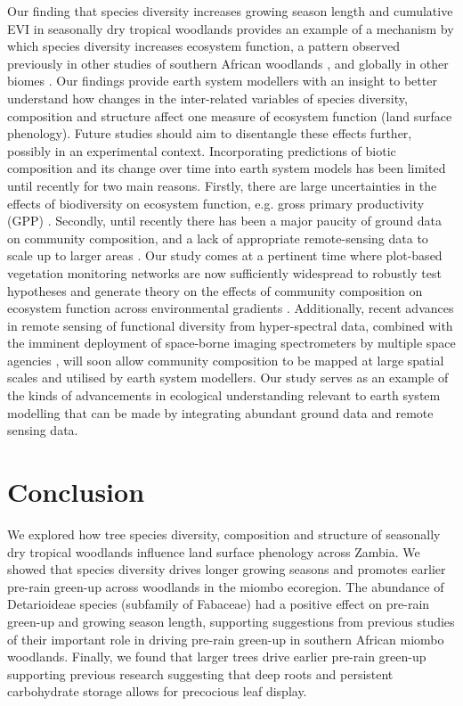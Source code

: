 \documentclass[11pt,a4paper]{article}
\begin{document}
Our finding that species diversity increases growing season length and
cumulative EVI in seasonally dry tropical woodlands provides an example of a
mechanism by which species diversity increases ecosystem function, a pattern
observed previously in other studies of southern African woodlands
\citep{Godlee2021, McNicol2018, Shirima2015}, and globally in other biomes
\citep{Plas2019, Tilman2014}. Our findings provide earth system modellers with
an insight to better understand how changes in the inter-related variables of
species diversity, composition and structure affect one measure of ecosystem
function (land surface phenology). Future studies should aim to disentangle
these effects further, possibly in an experimental context. Incorporating
predictions of biotic composition and its change over time into earth system
models has been limited until recently for two main reasons. Firstly, there are
large uncertainties in the effects of biodiversity on ecosystem function, e.g.
gross primary productivity (GPP) \citep{Ahlstrom2015}. Secondly, until recently
there has been a major paucity of ground data on community composition, and a
lack of appropriate remote-sensing data to scale up to larger areas
\citep{Bodegom2011}. Our study comes at a pertinent time where plot-based
vegetation monitoring networks are now sufficiently widespread to robustly test
hypotheses and generate theory on the effects of community composition on
ecosystem function across environmental gradients \citep{ForestPlotsnet2021,
SEOSAW2020}. Additionally, recent advances in remote sensing of functional
diversity from hyper-spectral data, combined with the imminent deployment of
space-borne imaging spectrometers by multiple space agencies
\citep{CawseNicholson2021, Rast2021}, will soon allow community composition to
be mapped at large spatial scales \citep{Wallis2024, Cavendar2020} and utilised
by earth system modellers. Our study serves as an example of the kinds of
advancements in ecological understanding relevant to earth system modelling
that can be made by integrating abundant ground data and remote sensing data.

\section{Conclusion}

We explored how tree species diversity, composition and structure of seasonally
dry tropical woodlands influence land surface phenology across Zambia. We
showed that species diversity drives longer growing seasons and promotes
earlier pre-rain green-up across woodlands in the miombo ecoregion. The
abundance of Detarioideae species (subfamily of Fabaceae) had a positive effect
on pre-rain green-up and growing season length, supporting suggestions from
previous studies of their important role in driving pre-rain green-up in
southern African miombo woodlands. Finally, we found that larger trees drive
earlier pre-rain green-up supporting previous research suggesting that deep
roots and persistent carbohydrate storage allows for precocious leaf display.
\end{document}
